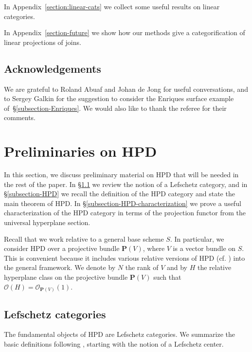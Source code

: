 \documentclass[11pt, reqno]{amsart}
\numberwithin{equation}{section}
\theoremstyle{plain}
\theoremstyle{definition}
\newcommand{\cO}{\mathcal{O}}
\newcommand{\bP}{\mathbf{P}}
\begin{document}
In Appendix~\ref{section:linear-cats} we collect some useful results on linear categories. 

In Appendix~\ref{section-future} we show how our methods give a categorification of linear projections of joins.

\subsection{Acknowledgements} 
We are grateful to Roland Abuaf and Johan de Jong for useful conversations,
and to Sergey Galkin for the suggestion to consider the Enriques surface example of~\S\ref{subsection-Enriques}. 
We would also like to thank the referee for their comments.  


\section{Preliminaries on HPD}
\label{section-HPD} 

In this section, we discuss preliminary material on HPD that will be needed 
in the rest of the paper. 
In \S\ref{subsection-lef-cats} we review the notion of a Lefschetz category, 
and in \S\ref{subsection-HPD} we recall the definition of the HPD category 
and state the main theorem of HPD. 
In \S\ref{subsection-HPD-characterization} we prove a useful 
characterization of the HPD category in terms of the projection functor 
from the universal hyperplane section. 

Recall that we work relative to a general base scheme $S$. 
In particular, we consider HPD over a projective bundle $\bP(V)$, where $V$ is a vector bundle on $S$. 
This is convenient because it includes various relative versions of HPD (cf. \cite[Theorem~6.27 and Remark~6.28]{kuznetsov-hpd}) into the general framework.
We denote by $N$ the rank of $V$ and by 
$H$ the relative hyperplane class on the projective bundle $\bP(V)$ 
such that~$\cO(H) = \cO_{\bP(V)}(1)$. 

\subsection{Lefschetz categories} 
\label{subsection-lef-cats}

The fundamental objects of HPD are Lefschetz categories. 
We summarize the basic definitions following \cite[\S6]{NCHPD}, 
starting with the notion of a Lefschetz center. 
\end{document}
